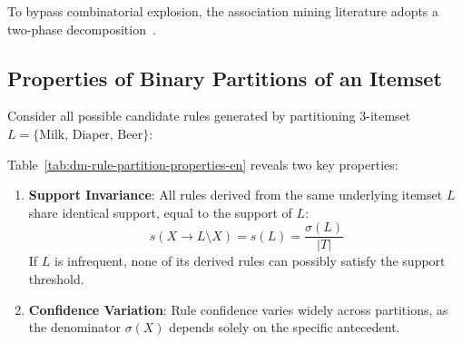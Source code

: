To bypass combinatorial explosion, the association mining literature adopts a two-phase decomposition~\cite{agrawal1993, agrawal1994, tan2018}.

\subsection{Properties of Binary Partitions of an Itemset}
Consider all possible candidate rules generated by partitioning 3-itemset $L = \{\text{Milk, Diaper, Beer}\}$:

\begin{table}[htbp]
\centering
\small
\renewcommand{\arraystretch}{1.2}
\caption{Rule properties across binary partitions of $\{\text{Milk, Diaper, Beer}\}$.}
\label{tab:dm-rule-partition-properties-en}
\end{table}

Table~\ref{tab:dm-rule-partition-properties-en} reveals two key properties:
\begin{enumerate}
    \item \textbf{Support Invariance}: All rules derived from the same underlying itemset $L$ share identical support, equal to the support of $L$:
    \begin{equation}
    s(X \longrightarrow L \setminus X) = s(L) = \frac{\sigma(L)}{|T|}
    \end{equation}
    If $L$ is infrequent, none of its derived rules can possibly satisfy the support threshold.
    \item \textbf{Confidence Variation}: Rule confidence varies widely across partitions, as the denominator $\sigma(X)$ depends solely on the specific antecedent.
\end{enumerate}

